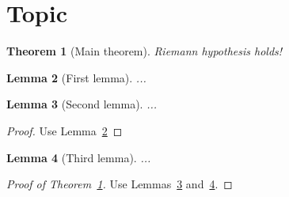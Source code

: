 \documentclass{article}
\newtheorem{theorem}{Theorem}
\newtheorem{lemma}[theorem]{Lemma}
\begin{document}
\section{Topic}

\begin{theorem}[Main theorem]\label{thm:1}
Riemann hypothesis holds!
\end{theorem}

\begin{lemma}[First lemma]\label{lem:1}
  ...
\end{lemma}

\begin{lemma}[Second lemma]\label{lem:2}
...
\end{lemma}
\begin{proof}
Use Lemma~\ref{lem:1}
\end{proof}

\begin{lemma}[Third lemma]\label{lem:3}
...
\end{lemma}

\begin{proof}[Proof of Theorem~\ref{thm:1}]
Use Lemmas~\ref{lem:2} and~\ref{lem:3}.
\end{proof}
\end{document}
